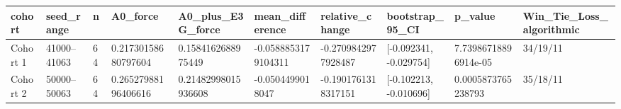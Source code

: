 \begin{tabular}{llllllllll}
\toprule
cohort & seed\_range & n & A0\_force & A0\_plus\_E3G\_force & mean\_difference & relative\_change & bootstrap\_95\_CI & p\_value & Win\_Tie\_Loss\_algorithmic \\
\midrule
Cohort 1 & 41000–41063 & 64 & 0.21730158680797604 & 0.1584162688975449 & -0.0588853179104311 & -0.2709842977928487 & [-0.092341, -0.029754] & 7.73986718896914e-05 & 34/19/11 \\
Cohort 2 & 50000–50063 & 64 & 0.26527988196406616 & 0.21482998015936608 & -0.0504499018047 & -0.1901761318317151 & [-0.102213, -0.010696] & 0.0005873765238793 & 35/18/11 \\
\bottomrule
\end{tabular}
